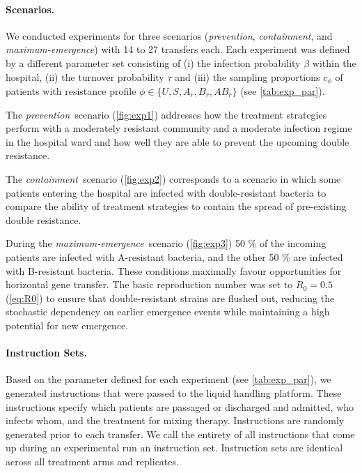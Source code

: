 \paragraph{Scenarios.}
We conducted experiments for three scenarios (\textit{prevention}, \textit{containment}, and \textit{maximum-emergence}) with 14 to 27 transfers each.
Each experiment was defined by a different parameter set consisting of (i) the infection probability $\beta$ within the hospital, (ii) the turnover probability $\tau$ and (iii) the sampling proportions $c_\phi$ of patients with resistance profile $\phi \in \{U, S, A_r, B_r, AB_r\}$ (see \autoref{tab:exp_par}).

The \textit{prevention}~scenario (\autoref{fig:exp1}) addresses how the treatment strategies perform with a moderately resistant community and a moderate infection regime in the hospital ward and how well they are able to prevent the upcoming double resistance.

The \textit{containment}~scenario (\autoref{fig:exp2}) corresponds to a scenario in which some patients entering the hospital are infected with double-resistant bacteria to compare the ability of treatment strategies to contain the spread of pre-existing double resistance.

During the \textit{maximum-emergence}~scenario (\autoref{fig:exp3}) 50 \% of the incoming patients are infected with A-resistant bacteria, and the other 50 \% are infected with B-resistant bacteria. These conditions maximally favour opportunities for horizontal gene transfer.
The basic reproduction number was set to $R_0 = 0.5$ (\autoref{eq:R0}) to ensure that double-resistant strains are flushed out, reducing the stochastic dependency on earlier emergence events while maintaining a high potential for new emergence.

\paragraph{Instruction Sets.}
Based on the parameter defined for each experiment (see \autoref{tab:exp_par}), we generated instructions that were passed to the liquid handling platform.
These instructions specify which patients are passaged or discharged and admitted, who infects whom, and the treatment for mixing therapy.
Instructions are randomly generated prior to each transfer.
We call the entirety of all instructions that come up during an experimental run an instruction set.
Instruction sets are identical across all treatment arms and replicates.

